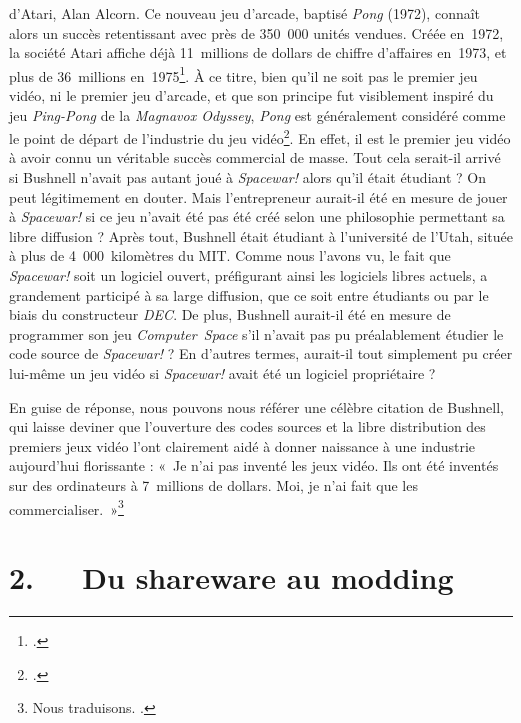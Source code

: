 \documentclass{FramateX}
\begin{document}
\begin{refsection}
d'Atari, Alan Alcorn. Ce
nouveau jeu d'arcade, baptisé \textit{Pong} (1972), connaît alors un succès retentissant avec près de 350~000
unités vendues. Créée en~1972, la société
Atari affiche déjà 11~millions de
dollars de chiffre d'affaires en~1973, et plus de 36~millions en~1975\footnote{\cite{learmonthno1999}.}. À ce titre, bien qu'il ne soit pas le premier jeu
vidéo, ni le premier jeu d'arcade, et que son principe fut visiblement
inspiré du jeu  \textit{Ping-Pong} de la \textit{Magnavox Odyssey},
\textit{Pong} est généralement considéré
comme le point de départ de l'industrie du jeu vidéo\footnote{\cite{donovanreplay:2010}.}.
En effet, il est le premier jeu vidéo à avoir connu un véritable succès
commercial de masse. Tout cela serait-il arrivé si Bushnell n'avait pas
autant joué à \textit{Spacewar!} alors qu'il
était étudiant ? On peut légitimement en douter. Mais l'entrepreneur
aurait-il été en mesure de jouer à \textit{Spacewar!} si ce jeu n'avait été pas
été créé selon une philosophie permettant sa libre diffusion ? Après
tout, Bushnell était étudiant à l'université de l'Utah, située à plus
de 4~000~kilomètres du MIT. Comme nous l'avons vu, le fait que \textit{Spacewar!} soit un logiciel ouvert,
préfigurant ainsi les logiciels libres actuels, a grandement participé
à sa large diffusion, que ce soit entre étudiants ou par le biais du
constructeur \textit{DEC}. De plus, Bushnell
aurait-il été en mesure de programmer son jeu \textit{Computer~Space} s'il n'avait pas pu
préalablement étudier le code source de \textit{Spacewar!} ? En d'autres termes,
aurait-il tout simplement pu créer lui-même un jeu vidéo si
\textit{Spacewar!} avait été un logiciel propriétaire ?


En guise de réponse, nous pouvons nous référer une célèbre citation de
Bushnell, qui laisse deviner que l'ouverture des codes sources et la
libre distribution des premiers jeux vidéo l'ont clairement aidé à
donner naissance à une industrie aujourd'hui florissante : «~Je n'ai
pas inventé les jeux vidéo. Ils ont été inventés sur des ordinateurs à
7~millions de dollars. Moi, je n'ai fait que les
commercialiser.~»\footnote{Nous traduisons. \cite{learmonthno1999}.}



\section*{2.~~~Du \textup{shareware} au \textup{modding}}
{}


\end{refsection}
\end{document}
